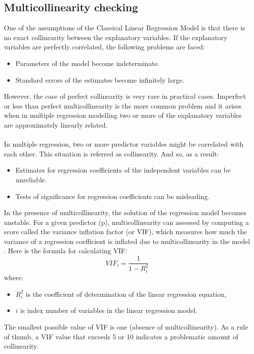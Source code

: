 \documentclass[a4paper]{article}
\begin{document}
\subsection{Multicollinearity checking}
One of the assumptions of the Classical Linear Regression Model \cite{bib7} is that there is no exact collinearity between the explanatory variables. If the explanatory variables are perfectly correlated, the following problems are faced:
\begin{itemize}
    \item Parameters of the model become indeterminate.
    \item Standard errors of the estimates become infinitely large.
\end{itemize}
However, the case of perfect collinearity is very rare in practical cases. Imperfect or less than perfect multicollinearity is the more common problem and it arises when in multiple regression modelling two or more of the explanatory variables are approximately linearly related.\\\\
In multiple regression, two or more predictor variables might be correlated with each other. This situation is referred as collinearity. And so, as a result:
\begin{itemize}
    \item Estimates for regression coefficients of the independent variables can be unreliable.
    \item Tests of significance for regression coefficients can be misleading.
\end{itemize}
In the presence of multicollinearity, the solution of the regression model becomes unstable. For a given predictor (p), multicollinearity can assessed by computing a score called the variance inflation factor (or VIF), which measures how much the variance of a regression coefficient is inflated due to multicollinearity in the model \cite{bib8}. Here is the formula for calculating VIF:
\begin{equation*}
    VIF_i=\dfrac{1}{1-R_i^2}
\end{equation*}
where:
\begin{itemize}
    \item $R_i^2$ is the coefficient of determination of the linear regression equation, 
    \item $i$  is index number of variables in the linear regression model.
\end{itemize}
The smallest possible value of VIF is one (absence of multicollinearity). As a rule of thumb, a VIF value that exceeds 5 or 10 indicates a problematic amount of collinearity.\\\\
\end{document}
